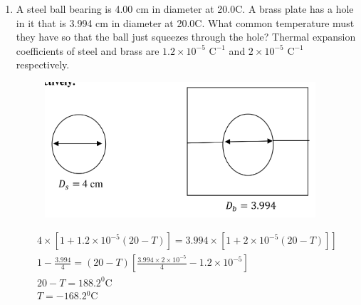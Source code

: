 \documentclass{zc-ust-hw}
\begin{document}
\begin{enumerate}
  \item  A steel ball bearing is 4.00 cm in diameter at 20.0\textdegree C. A brass plate
    has a hole in it that is 3.994 cm in diameter at 20.0\textdegree C. What common
    temperature must they have so that the ball just squeezes through the hole?
    Thermal expansion coefficients of steel and brass are \(1.2\times 10^{-5}\text{ C}^{-1}\)
    and \(2\times 10^{-5}\text{ C}^{-1}\) respectively.
    \begin{figure}[H]
      \begin{center}
        \includegraphics[width=0.95\textwidth]{figures/1705971983.png}
      \end{center}
      \caption{}\label{fig:}
    \end{figure}
    
    \begin{sol}
        \begin{gather}
          \left.4 \times\left[1+1.2 \times 10^{-5}(20-T)\right]=3.994 \times\left[1+2 \times 10^{-5}(20-T)\right]\right] \\
          1-\frac{3.994}{4}=(20-T)\left[\frac{3.994 \times 2 \times 10^{-5}}{4}-1.2 \times 10^{-5}\right] \\
          20-T=188.2^0 \mathrm{C} \\
          T=-168.2{ }^0 \mathrm{C}
        \end{gather}
    \end{sol}


\end{enumerate}
\end{document}
